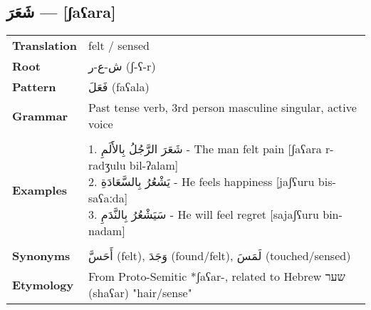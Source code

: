 \documentclass[letter,12pt]{article}
\begin{document}
\subsection{\textarabic{شَعَرَ} — [ʃaʕara]}
\begin{tabular}{p{3cm}p{10cm}}
\toprule
\textbf{Translation} & felt / sensed \\
\textbf{Root} & \textarabic{ش-ع-ر} (ʃ-ʕ-r) \\
\textbf{Pattern} & \textarabic{فَعَلَ} (faʕala) \\
\textbf{Grammar} & Past tense verb, 3rd person masculine singular, active voice \\
\midrule \\
\textbf{Examples} & \makecell[l]{\parbox{9.5cm}{
1. \textarabic{شَعَرَ الرَّجُلُ بِالأَلَمِ} - The man felt pain [ʃaʕara r-radʒulu bil-ʔalam]\\
2. \textarabic{يَشْعُرُ بِالسَّعَادَةِ} - He feels happiness [jaʃʕuru bis-saʕaːda]\\
3. \textarabic{سَيَشْعُرُ بِالنَّدَمِ} - He will feel regret [sajaʃʕuru bin-nadam]
}} \\
\midrule \\
\textbf{Synonyms} & \textarabic{أَحَسَّ} (felt), \textarabic{وَجَدَ} (found/felt), \textarabic{لَمَسَ} (touched/sensed) \\
\textbf{Etymology} & From Proto-Semitic *ʃaʕar-, related to Hebrew \texthebrew{שער} (shaʕar) "hair/sense" \\
\bottomrule
\end{tabular}
\end{document}
